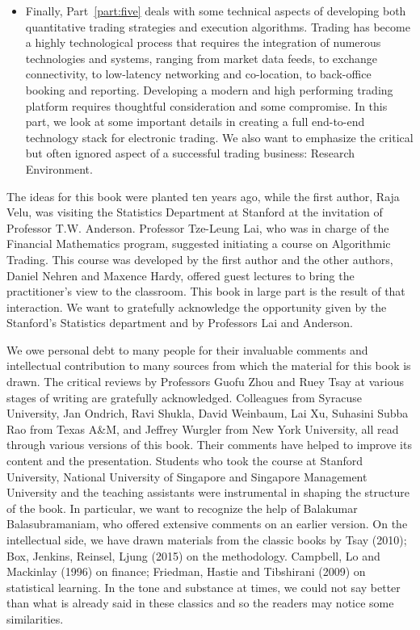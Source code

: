 \begin{itemize}
\item Finally, Part~\ref{part:five} deals with some technical aspects of developing both quantitative trading strategies and execution algorithms. Trading has become a highly technological process that requires the integration of numerous technologies and systems,  ranging from market data feeds, to exchange connectivity, to low-latency networking and co-location, to back-office booking and reporting. Developing a modern and high performing trading platform requires thoughtful consideration and some compromise. In this part, we look at some important details in creating a full end-to-end technology stack for electronic trading. We also want to emphasize the critical but often ignored aspect of a successful trading business: Research Environment. \twomedskip
\end{itemize} 


 \medbreak

The ideas for this book were planted ten years ago, while the first author, Raja Velu, was visiting the Statistics Department at Stanford at the invitation of Professor T.W. Anderson. Professor Tze-Leung Lai, who was in charge of the Financial Mathematics program, suggested initiating a course on Algorithmic Trading. This course was developed by the first author and the other authors, Daniel Nehren and Maxence Hardy, offered guest lectures to bring the practitioner's view to the classroom. This book in large part is the result of that interaction. We want to gratefully acknowledge the opportunity given by the Stanford's Statistics department and by Professors Lai and Anderson. 


We owe personal debt to many people for their invaluable comments and intellectual contribution to many sources from which the material for this book is drawn. The critical reviews by Professors Guofu Zhou and Ruey Tsay at various stages of writing are gratefully acknowledged. Colleagues from Syracuse University, Jan Ondrich, Ravi Shukla, David Weinbaum, Lai Xu, Suhasini Subba Rao from Texas A\&M, and Jeffrey Wurgler from New York University, all read through various versions of this book. Their comments have helped to improve its content and the presentation. Students who took the course at Stanford University, National University of Singapore and Singapore Management University and the teaching assistants were instrumental in shaping the structure of the book. In particular, we want to recognize the help of Balakumar Balasubramaniam, who offered extensive comments on an earlier version. On the intellectual side, we have drawn materials from the classic books by Tsay (2010); Box, Jenkins, Reinsel, Ljung (2015) on the methodology. Campbell, Lo and Mackinlay (1996) on finance; Friedman, Hastie and Tibshirani (2009) on statistical learning. In the tone and substance at times, we could not say better than what is already said in these classics and so the readers may notice some similarities.


